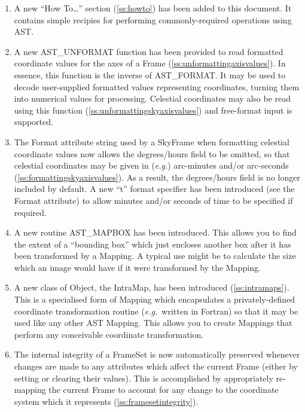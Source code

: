 \documentclass[twoside,11pt]{article}
\newcommand{\htmlref}[2]{#1}
\newcommand{\secref}[1]{\S\ref{#1}}
\renewcommand{\secref}[1]{\ref{#1}}
\begin{document}
\begin{enumerate}

\item A new ``How To\ldots'' section (\secref{ss:howto}) has been
added to this document. It contains simple recipies for performing
commonly-required operations using AST.

\item A new \htmlref{AST\_UNFORMAT}{AST_UNFORMAT} function has been provided to read formatted
coordinate values for the axes of a \htmlref{Frame}{Frame}
(\secref{ss:unformattingaxisvalues}). In essence, this function is the
inverse of \htmlref{AST\_FORMAT}{AST_FORMAT}. It may be used to decode user-supplied
formatted values representing coordinates, turning them into numerical
values for processing.  Celestial coordinates may also be read using
this function (\secref{ss:unformattingskyaxisvalues}) and free-format
input is supported.

\item The Format attribute string used by a \htmlref{SkyFrame}{SkyFrame} when formatting
celestial coordinate values now allows the degrees/hours field to be
omitted, so that celestial coordinates may be given in ({\em{e.g.}})
arc-minutes and/or arc-seconds
(\secref{ss:formattingskyaxisvalues}). As a result, the degrees/hours
field is no longer included by default.  A new ``t'' format specifier
has been introduced (see the Format attribute) to allow minutes and/or
seconds of time to be specified if required.

\item A new routine \htmlref{AST\_MAPBOX}{AST_MAPBOX} has been introduced. This allows you
to find the extent of a ``bounding box'' which just encloses another
box after it has been transformed by a \htmlref{Mapping}{Mapping}. A typical use might be
to calculate the size which an image would have if it were transformed
by the Mapping.

\item A new class of \htmlref{Object}{Object}, the \htmlref{IntraMap}{IntraMap}, has been introduced
(\secref{ss:intramaps}). This is a specialised form of Mapping which
encapsulates a privately-defined coordinate transformation routine
({\em{e.g.}}\ written in Fortran) so that it may be used like any
other AST Mapping. This allows you to create Mappings that perform any
conceivable coordinate transformation.

\item The internal integrity of a \htmlref{FrameSet}{FrameSet} is now automatically
preserved whenever changes are made to any attributes which affect the
current Frame (either by setting or clearing their values). This is
accomplished by appropriately re-mapping the current Frame to account
for any change to the coordinate system which it represents
(\secref{ss:framesetintegrity}).


\end{enumerate}
\end{document}
